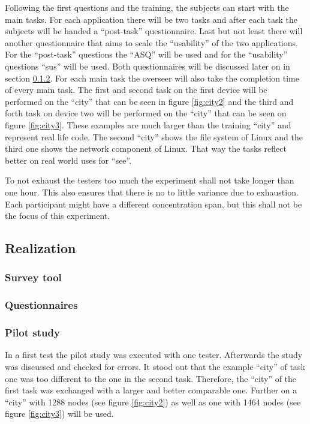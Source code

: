 Following the first questions and the training, the subjects can start with the main tasks.
For each application there will be two tasks and after each task the subjects will be handed a \enquote{\gls{post-task}} questionnaire.
Last but not least there will another questionnaire that aims to scale the \enquote{\gls{usability}} of the two applications.
For the \enquote{\gls{post-task}} questions the \enquote{\gls{ASQ}} will be used and for the \enquote{\gls{usability}} questions \enquote{\gls{sus}} will be used.
Both questionnaires will be discussed later on in section \ref{questionaires}.
For each main task the overseer will also take the completion time of every main task.
The first and second task on the first device will be performed on the \enquote{\gls{city}} that can be seen in figure \ref{fig:city2} and the third and forth task on device two will be performed on the \enquote{\gls{city}} that can be seen on figure \ref{fig:city3}.
These examples are much larger than the training \enquote{\gls{city}} and represent real life code.
The second \enquote{\gls{city}} shows the file system of Linux and the third one shows the network component of Linux. 
That way the tasks reflect better on real world uses for \enquote{\gls{see}}.

To not exhaust the testers too much the experiment shall not take longer than one hour. 
This also ensures that there is no to little variance due to exhaustion.
Each participant might have a different concentration span, but this shall not be the focus of this experiment. 

\subsection{Realization}
\subsubsection{Survey tool}
\subsubsection{Questionnaires}
\label{questionaires}
\subsubsection{Pilot study}
In a first test the pilot study was executed with one tester. 
Afterwards the study was discussed and checked for errors. 
It stood out that the example \enquote{\gls{city}} of task one was too different to the one in the second task.
Therefore, the \enquote{\gls{city}} of the first task was exchanged with a larger and better comparable one.
Further on a \enquote{\gls{city}} with 1288 nodes (see figure \ref{fig:city2}) as well as one with 1464 nodes (see figure \ref{fig:city3}) will be used.


